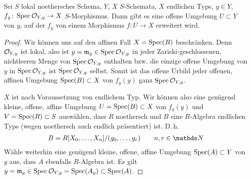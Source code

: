 \documentclass[german]{scrreprt}
\begin{document}
\begin{Lemma}\label{thm:morphismuserweiterung}
  Sei $S$ lokal noethersches Schema, $Y$, $X$ $S$-Schemata, $X$
  endlichen Typs, $y\in Y$, $f_y\colon \operatorname{Spec}\mathcal{O}_{Y,y}\to X$
  $S$-Morphismus.
  Dann gibt es eine offene Umgebung $U\subset Y$ von $y$, auf der
  $f_y$ von einem Morphismus $f\colon U\to X$ erweitert wird.
  \begin{proof}
    Wir können uns auf den affinen Fall $X=\operatorname{Spec}(B)$ beschränken.
    Denn $\mathcal{O}_{Y,y}$ ist lokal, also ist $y=\mathfrak{m}_y\in\operatorname{Spec}\mathcal{O}_{Y,y}$ in jeder
    Zariski-geschlossenen, nichtleeren Menge von $\operatorname{Spec}\mathcal{O}_{Y,y}$
    enthalten bzw. die einzige offene Umgebung von $y$ in
    $\operatorname{Spec}\mathcal{O}_{Y,y}$ ist $\operatorname{Spec}\mathcal{O}_{Y,y}$ selbst.
    Somit ist das offene Urbild jeder offenen, affinen Umgebung
    $\operatorname{Spec}(B)\subset X$ von $f_y(y)$ ganz $\operatorname{Spec}\mathcal{O}_{Y,y}$.

    $X$ ist nach Voraussetzung von endlichem Typ.
    Wir können also eine genügend kleine, offene, affine Umgebung
    $U=\operatorname{Spec}(B)\subset X$ von $f_y(y)$ und $V=\operatorname{Spec}(R)\subset S$ auswählen,
    dass $R$ noethersch und $B$ eine $R$-Algebra endlichen Typs (wegen
    noethersch auch endlich präsentiert) ist. D.\,h.
    \begin{gather*}
      B=R[X_0,\dotsc, X_n]/(g_0,\dotsc, g_r)\qquad n,r\in\N
    \end{gather*}
    Wähle weiterhin eine genügend kleine, offene, affine Umgebung
    $\operatorname{Spec}(A)\subset Y$ von $y$ aus, dass $A$ ebenfalls $R$-Algebra ist.
    Es gilt $y=\mathfrak{m}_y\in\operatorname{Spec}\mathcal{O}_{Y,y}=\operatorname{Spec}(A_y)\subset\operatorname{Spec}(A)$.
    

\end{proof}
\end{Lemma}
\end{document}
